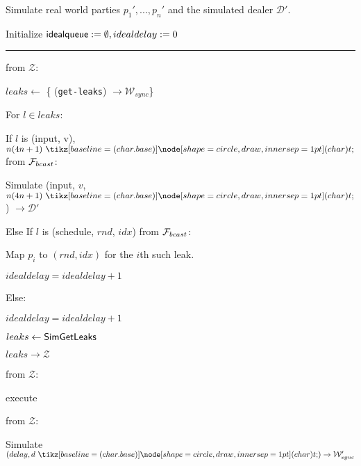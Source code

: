 \begin{bbox}[title={Simulator $\mathcal{S}_{bracha} (\mathcal{D}, \mathcal{P}, \Delta)$}]

Simulate real world parties $p_1',...,p_n'$ and the simulated dealer $\mathcal{D}'$.

Initialize ${\mathsf {idealqueue}} := \emptyset, idealdelay := 0$

\vspace{2mm} \hrule \vspace{2mm}

\OnInput {} from $\mathcal{Z}$:
	\begin{renumerate}
	\item $leaks \leftarrow$ \{ \Send (\texttt{get-leaks}) $\rightarrow \mathcal{W}_{sync}$\}

	\item For $l \in leaks$:
		\begin{renumerate}
		\item If $l$ is (input, v), $n(4n+1) \token$ from $\mathcal{F}_{bcast}$:

			\quad Simulate (input, $v$, $n(4n+1) \token$) $\rightarrow \mathcal{D}'$ 

		\item Else If $l$ is (schedule, $rnd$, $idx$) from $\mathcal{F}_{bcast}$:

			\quad Map $p_i$ to $(rnd,idx)$ for the $i$th such leak.

			\quad $idealdelay = idealdelay + 1$

		\item Else:

			\quad $idealdelay = idealdelay + 1$
		\end{renumerate}
	\item $leaks \leftarrow {\mathsf {SimGetLeaks}}$

	\item \Send $leaks \rightarrow \mathcal{Z}$
	\end{renumerate}

\OnInput {} from $\mathcal{Z}$:
	\begin{renumerate}
	\item execute \msf{Poll}
	\end{renumerate}

\OnInput {} from $\mathcal{Z}$:
	\begin{renumerate}
	\item Simulate $(delay, d \token) \rightarrow \mathcal{W}_{sync}'$


\end{renumerate}
\end{bbox}
